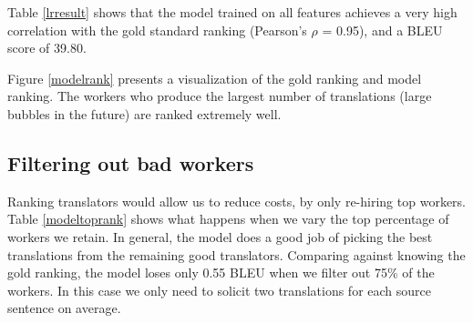 \documentclass[11pt,letterpaper]{article}
\begin{document}
Table \ref{lrresult} shows that the model trained on all features achieves a very high correlation with the gold standard ranking (Pearson's $\rho$ = 0.95), and a  BLEU score of 39.80.



Figure \ref{modelrank} presents a visualization of the gold ranking and model ranking. The workers who produce the largest number of translations (large bubbles in the future) are ranked extremely well.


\subsection{Filtering out bad workers}

Ranking translators would allow us to reduce costs, by only re-hiring top workers.
 Table \ref{modeltoprank} shows what happens when we vary the top percentage of workers we retain.  In general, the model does a good job of picking the best translations from the remaining good translators.  Comparing against knowing the gold ranking, the model loses only 0.55 BLEU when we filter out 75\% of the workers.  In this case we only need to solicit two translations for each source sentence on average.
\end{document}

